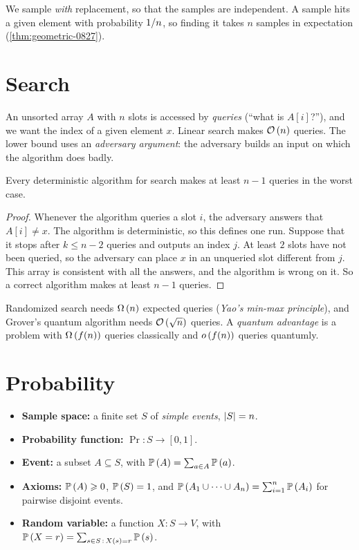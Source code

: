 We sample \emph{with} replacement, so that the samples are independent. A sample hits a given
element with probability $1/n$, so finding it takes $n$ samples in expectation
(\cref{thm:geometric-0827}).

\section{Search}

An unsorted array $A$ with $n$ slots is accessed by \emph{queries} (``what is $A[i]$?''), and we
want the index of a given element $x$. Linear search makes $\mathcal{O}\left(n\right)$ queries. The lower bound uses
an \emph{adversary argument}: the adversary builds an input on which the algorithm does badly.

\begin{theorem}\label{thm:detsearch-0825}
    Every deterministic algorithm for search makes at least $n - 1$ queries in the worst case.
\end{theorem}

\begin{proof}
    Whenever the algorithm queries a slot $i$, the adversary answers that $A[i] \neq x$. The algorithm
    is deterministic, so this defines one run. Suppose that it stops after $k \leq n - 2$ queries and
    outputs an index $j$. At least $2$ slots have not been queried, so the adversary can place $x$ in
    an unqueried slot different from $j$. This array is consistent with all the answers, and the
    algorithm is wrong on it. So a correct algorithm makes at least $n - 1$ queries.
\end{proof}

Randomized search needs $\Omega\left(n\right)$ expected queries (\emph{Yao's min-max principle}), and Grover's
quantum algorithm needs $\mathcal{O}\left(\sqrt{n}\right)$ queries. A \emph{quantum advantage} is a problem with
$\Omega\left(f(n)\right)$ queries classically and $o\left(f(n)\right)$ queries quantumly.

\section{Probability}

\begin{itemize}
    \item \textbf{Sample space:} a finite set $S$ of \emph{simple events}, $\left\lvert S\right\rvert = n$.
    \item \textbf{Probability function:} $\Pr \colon S \to [0,1]$.
    \item \textbf{Event:} a subset $A \subseteq S$, with $\operatorname{\mathbb{P}}\left(A\right) = \sum_{a \in A} \operatorname{\mathbb{P}}\left(a\right)$.
    \item \textbf{Axioms:} $\operatorname{\mathbb{P}}\left(A\right) \geqslant 0$, $\operatorname{\mathbb{P}}\left(S\right) = 1$, and
          $\operatorname{\mathbb{P}}\left(A_1 \cup \dots \cup A_n\right) = \sum_{i=1}^{n} \operatorname{\mathbb{P}}\left(A_i\right)$ for pairwise disjoint events.
    \item \textbf{Random variable:} a function $X \colon S \to V$, with
          $\operatorname{\mathbb{P}}\left(X = r\right) = \sum_{s \in S \,:\, X(s) = r} \operatorname{\mathbb{P}}\left(s\right)$.
\end{itemize}
